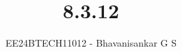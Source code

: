 \documentclass[journal]{IEEEtran}
\begin{document}

\vspace{3cm}

\title{8.3.12}
\author{EE24BTECH11012 - Bhavanisankar G S}
{\let\newpage\relax\maketitle}

\renewcommand{\thefigure}{\theenumi}
\renewcommand{\thetable}{\theenumi}
\setlength{\intextsep}{10pt} %


\renewcommand{\thetable}{\theenumi}
\end{document}
